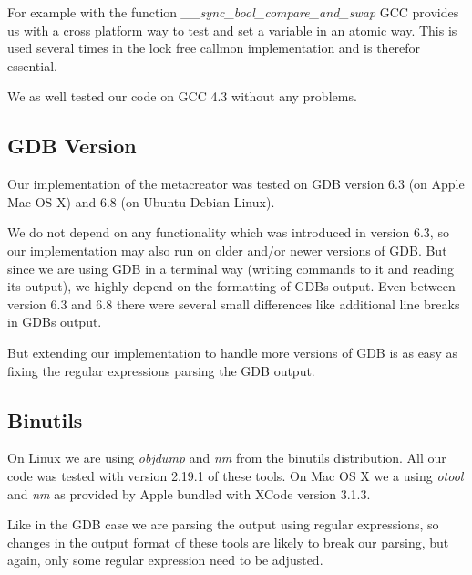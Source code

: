 For example with the function \emph{\_\_sync\_bool\_compare\_and\_swap} GCC provides us with a cross platform way to test and set a variable in an atomic way. This is used several times in the lock free callmon implementation and is therefor essential.

We as well tested our code on GCC 4.3 without any problems.

\subsection{GDB Version} Our implementation of the metacreator was tested on GDB version 6.3 (on Apple Mac OS X) and 6.8 (on Ubuntu Debian Linux).

We do not depend on any functionality which was introduced in version 6.3, so our implementation may also run on older and/or newer versions of GDB. But since we are using GDB in a terminal way (writing commands to it and reading its output), we highly depend on the formatting of GDBs output. Even between version 6.3 and 6.8 there were several small differences like additional line breaks in GDBs output.

But extending our implementation to handle more versions of GDB is as easy as fixing the regular expressions parsing the GDB output.

\subsection{Binutils} On Linux we are using \emph{objdump} and \emph{nm} from the binutils distribution. All our code was tested with version 2.19.1 of these tools. On Mac OS X we a using \emph{otool} and \emph{nm} as provided by Apple bundled with XCode version 3.1.3.

Like in the GDB case we are parsing the output using regular expressions, so changes in the output format of these tools are likely to break our parsing, but again, only some regular expression need to be adjusted.
